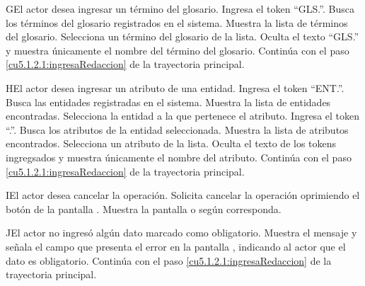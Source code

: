  \begin{UCtrayectoriaA}{G}{El actor desea ingresar un término del glosario.}
 	\UCpaso[\UCactor] Ingresa el token ``GLS.''.	
 	\UCpaso[\UCsist] Busca los términos del glosario registrados en el sistema. 
 	\UCpaso[\UCsist] Muestra la lista de términos del glosario.
 	\UCpaso[\UCactor] Selecciona un término del glosario de la lista.
  	\UCpaso[\UCsist] Oculta el texto ``GLS.'' y muestra únicamente el nombre del término del glosario.
    \UCpaso[] Continúa con el paso \ref{cu5.1.2.1:ingresaRedaccion} de la trayectoria principal.
 \end{UCtrayectoriaA}

 \begin{UCtrayectoriaA}{H}{El actor desea ingresar un atributo de una entidad.}
 	\UCpaso[\UCactor] Ingresa el token ``ENT.''.
 	\UCpaso[\UCsist] Busca las entidades registradas en el sistema. 
 	\UCpaso[\UCsist] Muestra la lista de entidades encontradas.
 	\UCpaso[\UCactor] Selecciona la entidad a la que pertenece el atributo.
  	\UCpaso[\UCactor] Ingresa el token ``.''.
  	\UCpaso[\UCsist] Busca los atributos de la entidad seleccionada.
  	\UCpaso[\UCsist] Muestra la lista de atributos encontrados.
 	\UCpaso[\UCactor] Selecciona un atributo de la lista.
  	\UCpaso[\UCsist] Oculta el texto de los tokens ingregsados y muestra únicamente el nombre del atributo.
    \UCpaso[] Continúa con el paso \ref{cu5.1.2.1:ingresaRedaccion} de la trayectoria principal.
 \end{UCtrayectoriaA}


 \begin{UCtrayectoriaA}{I}{El actor desea cancelar la operación.}
    \UCpaso[\UCactor] Solicita cancelar la operación oprimiendo el botón  de la pantalla .
    \UCpaso[\UCsist] Muestra la pantalla  o  según corresponda.
 \end{UCtrayectoriaA}
 
 \begin{UCtrayectoriaA}{J}{El actor no ingresó algún dato marcado como obligatorio.}
    \UCpaso[\UCsist] Muestra el mensaje  y señala el campo que presenta el error en la pantalla , indicando al actor que el dato es obligatorio.
    \UCpaso[] Continúa con el paso \ref{cu5.1.2.1:ingresaRedaccion} de la trayectoria principal.
 \end{UCtrayectoriaA}
 
